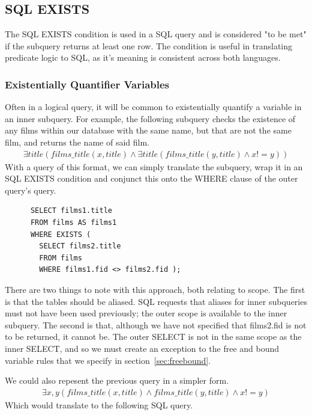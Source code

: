 \documentclass[a4paper, 11pt]{article}
\begin{document}
  \subsection{SQL EXISTS}
    The SQL EXISTS condition is used in a SQL query and is considered "to be
    met" if the subquery returns at least one row.\cite{technetEXISTS} The
    condition is useful in translating predicate logic to SQL, as it's meaning
    is consistent across both languages. 

    \subsubsection{Existentially Quantifier Variables}
    \label{sec:existential}
    Often in a logical query, it will be common to existentially quantify a
    variable in an inner subquery. For example, the following subquery checks
    the existence of any films within our database with the same name, but that
    are not the same film, and returns the name of said film.
    \begin{multline}
      \exists title(films\_title(x, title) \land \exists title(films\_title(y,
      title) \land x != y))
    \end{multline}
    With a query of this format, we can simply translate the subquery, wrap it
    in an SQL EXISTS condition and conjunct this onto the WHERE clause of the
    outer query's query.

    \begin{verbatim}
      SELECT films1.title
      FROM films AS films1
      WHERE EXISTS (
        SELECT films2.title
        FROM films
        WHERE films1.fid <> films2.fid );
    \end{verbatim}

    There are two things to note with this approach, both relating to scope.
    The first is that the tables should be aliased. SQL requests that aliases
    for inner subqueries must not have been used previously; the outer scope is
    available to the inner subquery. The second is that, although we have not
    specified that films2.fid is not to be returned, it cannot be. The outer
    SELECT is not in the same scope as the inner SELECT, and so we must create
    an exception to the free and bound variable rules that we specify in
    section~\ref{sec:freebound}.

    We could also repesent the previous query in a simpler form.
    \begin{multline}
      \exists x,y(films\_title(x, title) \land films\_title(y, title)
        \land x != y)
    \end{multline}
    Which would translate to the following SQL query.
\end{document}
